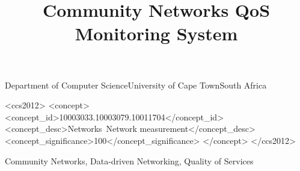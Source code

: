 \documentclass[plain]{sigplanconf}
\begin{document}
	\title{Community Networks QoS Monitoring System}

	{Department of Computer Science\linebreak University of Cape Town\linebreak South Africa}
	{}
	\maketitle
	\begin{abstract}
		
	\end{abstract}
	\begin{CCSXML}
		<ccs2012>
		<concept>
		<concept_id>10003033.10003079.10011704</concept_id>
		<concept_desc>Networks~Network measurement</concept_desc>
		<concept_significance>100</concept_significance>
		</concept>
		</ccs2012>
	\end{CCSXML}
	\keywords
	Community Networks, Data-driven Networking, Quality of Services
	






	
	
%	
\end{document}
